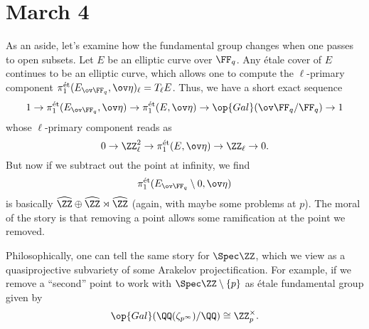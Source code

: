 \documentclass[../notes.tex]{subfiles}
\begin{document}
\section{March 4}
As an aside, let's examine how the fundamental group changes when one passes to open subsets. Let $E$ be an elliptic curve over $\FF_q$. Any \'etale cover of $E$ continues to be an elliptic curve, which allows one to compute the $\ell$-primary component $\pi_1^{\mathrm{\acute et}}(E_{\ov\FF_q},\ov\eta)_\ell=T_\ell E$. Thus, we have a short exact sequence
\[1\to\pi_1^{\mathrm{\acute et}}(E_{\ov\FF_q},\ov\eta)\to\pi_1^{\mathrm{\acute et}}(E,\ov\eta)\to\op{Gal}(\ov\FF_q/\FF_q)\to1\]
whose $\ell$-primary component reads as
\[0\to\ZZ_\ell^2\to\pi_1^{\mathrm{\acute et}}(E,\ov\eta)\to\ZZ_\ell\to0.\]
But now if we subtract out the point at infinity, we find
\[\pi_1^{\mathrm{\acute et}}(E_{\ov\FF_q}\setminus0,\ov\eta)\]
is basically $\widehat\ZZ\oplus\widehat\ZZ\rtimes\widehat\ZZ$ (again, with maybe some problems at $p$). The moral of the story is that removing a point allows some ramification at the point we removed.
\begin{example}
	Philosophically, one can tell the same story for $\Spec\ZZ$, which we view as a quasiprojective subvariety of some Arakelov projectification. For example, if we remove a ``second'' point to work with $\Spec\ZZ\setminus\{p\}$ as \'etale fundamental group given by
	\[\op{Gal}(\QQ(\zeta_{p^\infty})/\QQ)\cong\ZZ_p^\times.\]
\end{example}
\end{document}
